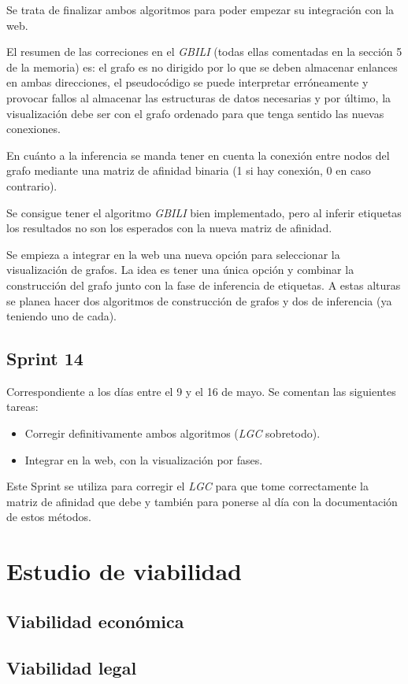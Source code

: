 Se trata de finalizar ambos algoritmos para poder empezar su integración con la web.

El resumen de las correciones en el \textit{GBILI} (todas ellas comentadas en la sección 5 de la memoria) es: el grafo es no dirigido por lo que se deben almacenar enlances en ambas direcciones, el pseudocódigo se puede interpretar erróneamente y provocar fallos al almacenar las estructuras de datos necesarias y por último, la visualización debe ser con el grafo ordenado para que tenga sentido las nuevas conexiones.

En cuánto a la inferencia se manda tener en cuenta la conexión entre nodos del grafo mediante una matriz de afinidad binaria (1 si hay conexión, 0 en caso contrario).

Se consigue tener el algoritmo \textit{GBILI} bien implementado, pero al inferir etiquetas los resultados no son los esperados con la nueva matriz de afinidad.

Se empieza a integrar en la web una nueva opción para seleccionar la visualización de grafos. La idea es tener una única opción y combinar la construcción del grafo junto con la fase de inferencia de etiquetas. A estas alturas se planea hacer dos algoritmos de construcción de grafos y dos de inferencia (ya teniendo uno de cada).

\subsection{Sprint 14}
Correspondiente a los días entre el 9 y el 16 de mayo. Se comentan las siguientes tareas:
\begin{itemize}
	\item Corregir definitivamente ambos algoritmos (\textit{LGC} sobretodo).
	\item Integrar en la web, con la visualización por fases.
\end{itemize}
Este Sprint se utiliza para corregir el \textit{LGC} para que tome correctamente la matriz de afinidad que debe y también para ponerse al día con la documentación de estos métodos.

\section{Estudio de viabilidad}

\subsection{Viabilidad económica}

\subsection{Viabilidad legal}

